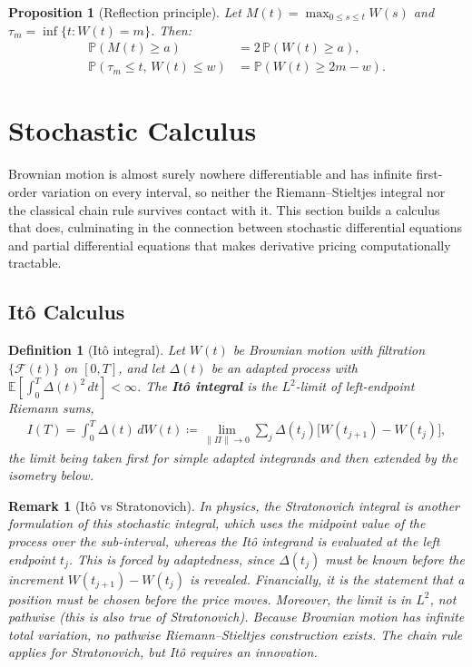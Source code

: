 \documentclass{report}
\theoremstyle{spacedplain}
\newtheorem{proposition}[theorem]{Proposition}
\theoremstyle{spaceddefinition}
\newtheorem{definition}[theorem]{Definition}
\theoremstyle{spacedremark}
\newtheorem{remark}[theorem]{Remark}
\begin{document}
\begin{proposition}[Reflection principle]
Let $M(t) = \max_{0 \leq s \leq t} W(s)$ and $\tau_m = \inf\{t : W(t) = m\}$. Then:
\begin{align}
    \mathbb{P}(M(t) \geq a) &= 2\,\mathbb{P}(W(t) \geq a), \\
    \mathbb{P}(\tau_m \leq t,\, W(t) \leq w) &= \mathbb{P}(W(t) \geq 2m - w).
\end{align}
\end{proposition}



\section{Stochastic Calculus}\label{sec:stoch-calc}

Brownian motion is almost surely nowhere differentiable and has infinite first-order variation on every interval, so neither the Riemann--Stieltjes integral nor the classical chain rule survives contact with it. This section builds a calculus that does, culminating in the connection between stochastic differential equations and partial differential equations that makes derivative pricing computationally tractable.

\subsection{It\^o Calculus}

\begin{definition}[It\^o integral]
Let $W(t)$ be Brownian motion with filtration $\{\mathcal{F}(t)\}$ on $[0,T]$, and let $\Delta(t)$ be an adapted process with $\mathbb{E}\!\left[\int_0^T \Delta(t)^2\, dt\right] < \infty$. The \textbf{It\^o integral} is the $L^2$-limit of left-endpoint Riemann sums,
\begin{align}
    I(T) = \int_0^T \Delta(t)\, dW(t) \coloneqq \lim_{\|\Pi\| \to 0} \sum_j \Delta(t_j)\bigl[W(t_{j+1}) - W(t_j)\bigr],
\end{align}
the limit being taken first for simple adapted integrands and then extended by the isometry below.
\end{definition}

\begin{remark}[It\^o vs Stratonovich]
In physics, the Stratonovich integral is another formulation of this stochastic integral, which uses the midpoint value of the process over the sub-interval, whereas the It\^o integrand is evaluated at the \emph{left} endpoint $t_j$. This is forced by adaptedness, since $\Delta(t_j)$ must be known before the increment $W(t_{j+1})-W(t_j)$ is revealed. Financially, it is the statement that a position must be chosen before the price moves. Moreover, the limit is in $L^2$, not pathwise (this is also true of Stratonovich). Because Brownian motion has infinite total variation, no pathwise Riemann--Stieltjes construction exists. The chain rule applies for Stratonovich, but It\^o requires an innovation.
\end{remark}
\end{document}
